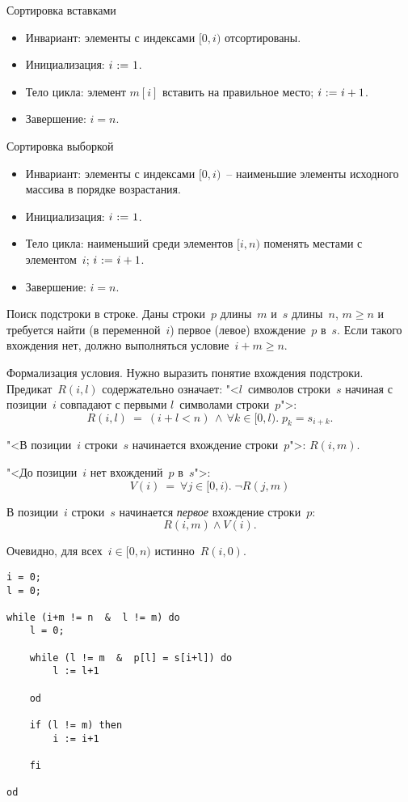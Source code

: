 \documentclass[landscape]{slides}
\begin{document}
\begin{slide}
Сортировка вставками
\begin{itemize}
    \item Инвариант: элементы с индексами $[0,i)$ отсортированы.
    \item Инициализация: $i\ \mathtt{:=}\  1$.
    \item Тело цикла: элемент $m[i]$ вставить на правильное место; $i\ \mathtt{:=}\  i+1$.
    \item Завершение: $i = n$.
\end{itemize}
\end{slide}

\begin{slide}
Сортировка выборкой
\begin{itemize}
    \item Инвариант: элементы с индексами $[0,i)$~-- наименьшие элементы исходного массива в порядке возрастания.
    \item Инициализация: $i\ \mathtt{:=}\  1$.
    \item Тело цикла: наименьший среди элементов $[i,n)$ поменять местами с элементом~$i$; $i\ \mathtt{:=}\  i+1$.
    \item Завершение: $i = n$.
\end{itemize}
\end{slide}

\begin{slide}
Поиск подстроки в строке. Даны строки~$p$ длины~$m$ и~$s$ длины~$n$, $m\geqslant n$ и требуется найти (в переменной~$i$) первое (левое) вхождение~$p$ в~$s$.
Если такого вхождения нет, должно выполняться условие~$i+m \geqslant n$.

Формализация условия. Нужно выразить понятие вхождения подстроки. Предикат~$R(i,l)$ содержательно означает: "<$l$~символов строки~$s$ начиная с позиции~$i$ совпадают с первыми $l$~символами строки~$p$">:
\[
R(i, l)\  =\  (i+l < n)\, \land\, \forall k\in[0,l).\; p_k = s_{i+k}.
\]

"<В позиции~$i$ строки~$s$ начинается вхождение строки~$p$">: $R(i,m)$.

"<До позиции~$i$ нет вхождений~$p$ в~$s$">:
\[
V(i)\ =\ \forall j\in[0,i).\; \neg R(j,m)
\]

В позиции~$i$ строки~$s$ начинается \emph{первое} вхождение строки~$p$:
\[
R(i,m) \land V(i) .
\]

Очевидно, для всех~$i\in[0,n)$ истинно~$R(i,0)$.
\end{slide}

\begin{slide}
\begin{verbatim}
i = 0;
l = 0;

while (i+m != n  &  l != m) do
    l = 0;

    while (l != m  &  p[l] = s[i+l]) do
        l := l+1
        
    od

    if (l != m) then
        i := i+1

    fi

od

\end{verbatim}
\end{slide}
\end{document}
